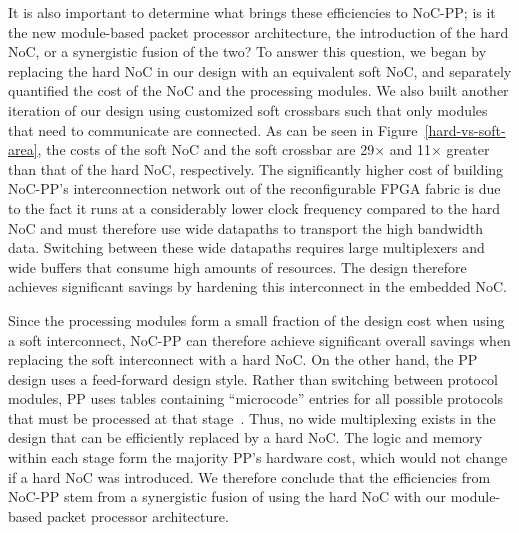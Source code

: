 It is also important to determine what brings these efficiencies to NoC-PP; is it the new module-based packet processor architecture, the introduction of the hard NoC, or a synergistic fusion of the two?
To answer this question, we began by replacing the hard NoC in our design with an equivalent soft NoC, and separately quantified the cost of the NoC and the processing modules.
We also built another iteration of our design using customized soft crossbars such that only modules that need to communicate are connected.
As can be seen in Figure~\mbox{\ref{hard-vs-soft-area}}, the costs of the soft NoC and the soft crossbar are 29$\times$ and 11$\times$ greater than that of the hard NoC, respectively.
The significantly higher cost of building NoC-PP's interconnection network out of the reconfigurable FPGA fabric is due to the fact it runs at a considerably lower clock frequency compared to the hard NoC and must therefore use wide datapaths to transport the high bandwidth data.
Switching between these wide datapaths requires large multiplexers and wide buffers that consume high amounts of resources.
The design therefore achieves significant savings by hardening this interconnect in the embedded NoC.

Since the processing modules form a small fraction of the design cost when using a soft interconnect, NoC-PP can therefore achieve significant overall savings when replacing the soft interconnect with a hard NoC.
On the other hand, the PP design uses a feed-forward design style.
Rather than switching between protocol modules, PP uses tables containing ``microcode'' entries for all possible protocols that must be processed at that stage~\cite{attig2011400}.
Thus, no wide multiplexing exists in the design that can be efficiently replaced by a hard NoC.
The logic and memory within each stage form the majority PP's hardware cost, which would not change if a hard NoC was introduced.
We therefore conclude that the efficiencies from NoC-PP stem from a synergistic fusion of using the hard NoC with our module-based packet processor architecture.

